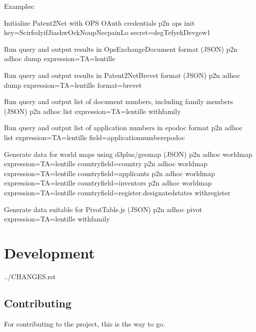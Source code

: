 \documentclass[letterpaper,10pt,english]{sphinxmanual}
\begin{document}
\begin{sphinxVerbatim}[commandchars=\\\{\}]
Examples:

  \PYGZsh{} Initialize Patent2Net with OPS OAuth credentials
  p2n ops init \PYGZhy{}\PYGZhy{}key=ScirfedyifJiashwOckNoupNecpainLo \PYGZhy{}\PYGZhy{}secret=degTefyekDevgew1

  \PYGZsh{} Run query and output results in OpsExchangeDocument format (JSON)
  p2n adhoc dump \PYGZhy{}\PYGZhy{}expression=\PYGZsq{}TA=lentille\PYGZsq{}

  \PYGZsh{} Run query and output results in Patent2NetBrevet format (JSON)
  p2n adhoc dump \PYGZhy{}\PYGZhy{}expression=\PYGZsq{}TA=lentille\PYGZsq{} \PYGZhy{}\PYGZhy{}format=brevet

  \PYGZsh{} Run query and output list of document numbers, including family members (JSON)
  p2n adhoc list \PYGZhy{}\PYGZhy{}expression=\PYGZsq{}TA=lentille\PYGZsq{} \PYGZhy{}\PYGZhy{}with\PYGZhy{}family

  \PYGZsh{} Run query and output list of application numbers in epodoc format
  p2n adhoc list \PYGZhy{}\PYGZhy{}expression=\PYGZsq{}TA=lentille\PYGZsq{} \PYGZhy{}\PYGZhy{}field=\PYGZsq{}application\PYGZus{}number\PYGZus{}epodoc\PYGZsq{}

  \PYGZsh{} Generate data for world maps using d3plus/geo\PYGZus{}map (JSON)
  p2n adhoc worldmap \PYGZhy{}\PYGZhy{}expression=\PYGZsq{}TA=lentille\PYGZsq{} \PYGZhy{}\PYGZhy{}country\PYGZhy{}field=\PYGZsq{}country\PYGZsq{}
  p2n adhoc worldmap \PYGZhy{}\PYGZhy{}expression=\PYGZsq{}TA=lentille\PYGZsq{} \PYGZhy{}\PYGZhy{}country\PYGZhy{}field=\PYGZsq{}applicants\PYGZsq{}
  p2n adhoc worldmap \PYGZhy{}\PYGZhy{}expression=\PYGZsq{}TA=lentille\PYGZsq{} \PYGZhy{}\PYGZhy{}country\PYGZhy{}field=\PYGZsq{}inventors\PYGZsq{}
  p2n adhoc worldmap \PYGZhy{}\PYGZhy{}expression=\PYGZsq{}TA=lentille\PYGZsq{} \PYGZhy{}\PYGZhy{}country\PYGZhy{}field=\PYGZsq{}register.designated\PYGZus{}states\PYGZsq{} \PYGZhy{}\PYGZhy{}with\PYGZhy{}register

  \PYGZsh{} Generate data suitable for PivotTable.js (JSON)
  p2n adhoc pivot \PYGZhy{}\PYGZhy{}expression=\PYGZsq{}TA=lentille\PYGZsq{} \PYGZhy{}\PYGZhy{}with\PYGZhy{}family
\end{sphinxVerbatim}


\chapter{Development}
\label{\detokenize{index:development}}
../CHANGES.rst


\section{Contributing}
\label{\detokenize{contributing:contributing}}\label{\detokenize{contributing::doc}}
For contributing to the project, this is the way to go.
\end{document}
